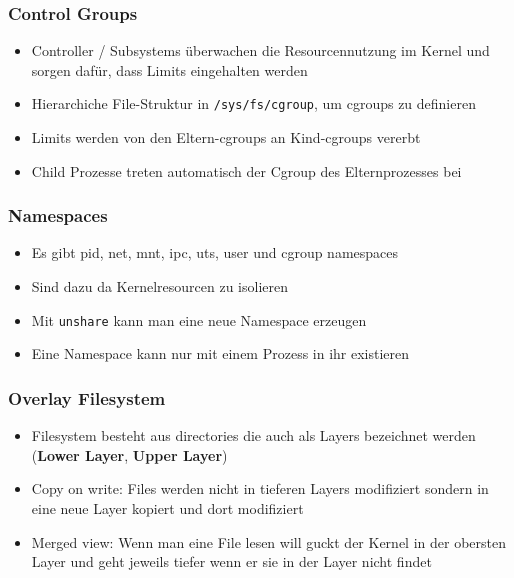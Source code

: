 \documentclass{beamer}
\begin{document}
\begin{frame}
  \frametitle{Control Groups} 
  \begin{itemize}
    \item Controller / Subsystems überwachen die Resourcennutzung im Kernel und sorgen dafür, dass Limits 
      eingehalten werden
    \item Hierarchiche File-Struktur in \texttt{/sys/fs/cgroup}, um cgroups zu definieren
    \item Limits werden von den Eltern-cgroups an Kind-cgroups vererbt
    \item Child Prozesse treten automatisch der Cgroup des Elternprozesses bei
  \end{itemize}
\end{frame}

\begin{frame}
  \frametitle{Namespaces}
  \begin{itemize}
    \item Es gibt pid, net, mnt, ipc, uts, user und cgroup namespaces
    \item Sind dazu da Kernelresourcen zu isolieren
    \item Mit \texttt{unshare} kann man eine neue Namespace erzeugen
    \item Eine Namespace kann nur mit einem Prozess in ihr existieren
  \end{itemize}
\end{frame}

\begin{frame}
  \frametitle{Overlay Filesystem}
  \begin{itemize}
    \item Filesystem besteht aus directories die auch als Layers bezeichnet werden (\textbf{Lower Layer}, \textbf{Upper Layer})
    \item Copy on write: Files werden nicht in tieferen Layers modifiziert sondern in eine neue Layer kopiert und dort modifiziert
    \item Merged view: Wenn man eine File lesen will guckt der Kernel in der obersten Layer und geht jeweils tiefer wenn er sie in der Layer nicht findet
  \end{itemize}
\end{frame}
\end{document}

